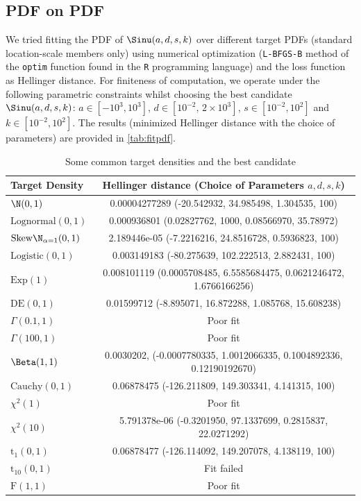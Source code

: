 \subsection{PDF on PDF}
We tried fitting the PDF of $\Sinu(a,d,s,k)$ over different target PDFs (standard location-scale members only) using numerical optimization (\texttt{L-BFGS-B} method of the \texttt{optim} function found in the \texttt{R} programming language) and the loss function as Hellinger distance. For finiteness of computation, we operate under the following parametric constraints whilst choosing the best candidate $\Sinu(a,d,s,k)$: $a \in [-10^3, 10^3]$, $d \in [10^{-2}, \, 2\times10^3]$, $s \in [10^{-2}, 10^2]$ and $k \in [10^{-2}, 10^2]$.
The results (minimized Hellinger distance with the choice of parameters) are provided in \autoref{tab:fitpdf}.
\begin{table}[h!]
    \centering
    \begin{tabularx}{\textwidth}{X|c}
        \toprule
        Target Density & Hellinger distance (Choice of Parameters $a,d,s,k$)\\
        \midrule
        $\N(0,1)$ & 0.00004277289 (-20.542932, 34.985498, 1.304535, 100)\\
        $\mathrm{Lognormal}(0,1)$ & 0.000936801 (0.02827762, 1000, 0.08566970, 35.78972) \\
        $\mathrm{Skew}\N_{\alpha=1} (0,1)$ & 2.189446e-05 (-7.2216216, 24.8516728, 0.5936823, 100) \\
        \hline
        $\mathrm{Logistic}(0,1)$ & 0.003149183 (-80.275639, 102.222513, 2.882431, 100) \\
        $\mathrm{Exp}(1)$ & 0.008101119 (0.0005708485, 6.5585684475, 0.0621246472, 1.6766166256) \\
        $\mathrm{DE}(0,1)$ & 0.01599712 (-8.895071, 16.872288, 1.085768, 15.608238) \\
        \hline
        $\Gamma(0.1,1)$ & Poor fit \\
        $\Gamma(100,1)$ & Poor fit \\
        $\Beta(1,1)$ & 0.0030202, (-0.0007780335, 1.0012066335, 0.1004892336, 0.12190192670) \\
        \hline
        $\mathrm{Cauchy}(0,1)$ & 0.06878475 (-126.211809, 149.303341, 4.141315, 100) \\
        \hline
        $\chi^2(1)$ & Poor fit \\
        $\chi^2(10)$ & 5.791378e-06 (-0.3201950, 97.1337699, 0.2815837, 22.0271292) \\
        $\mathrm{t}_1(0,1)$ & 0.06878477 (-126.114092, 149.207078, 4.138119, 100) \\
        $\mathrm{t}_{10}(0,1)$ & Fit failed \\
        $\mathrm{F}(1,1)$ & Poor fit \\
        \bottomrule
    \end{tabularx}
    \caption{Some common target densities and the best candidate \sindist{}}
    \label{tab:fitpdf}
\end{table}

